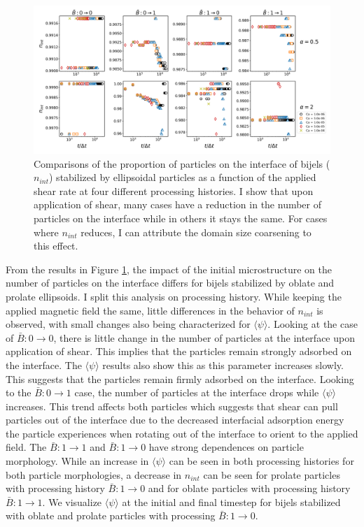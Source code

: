 \begin{figure} 
    \centering 
    \includegraphics[scale=0.3]{../figures/results/paper3/n_int-time_compare.png} 
    \caption{Comparisons of the proportion of particles on the interface of bijels ($n_{int}$) stabilized by ellipsoidal particles as a function of 
             the applied shear rate at four different processing histories. I show that upon application of shear, many cases have a 
             reduction in the number of particles on the interface while in others it stays the same. For cases where $n_{int}$ reduces, I can 
             attribute the domain size coarsening to this effect.} 
    \label{fig:particles_interface_prop_shear} 
\end{figure}

From the results in Figure \ref{fig:particles_interface_prop_shear}, the impact of the initial microstructure on the number of particles on the interface
differs for bijels stabilized by oblate and prolate ellipsoids. I split this analysis on processing history. While keeping the applied magnetic field
the same, little differences in the behavior of $n_{int}$ is observed, with small changes also being characterized for $\langle \psi \rangle$. 
Looking at the case of $\bar{B}:0 \rightarrow 0$, there is little change in the number of particles at the interface upon application of shear. This implies that the 
particles remain strongly adsorbed on the
interface. The $\langle \psi \rangle$ results also show this as this parameter increases slowly. This suggests that the particles remain firmly adsorbed
on the interface. Looking to the $\bar{B}:0 \rightarrow 1$ case, the number of particles at the interface drops while $\langle \psi \rangle$ increases. This
trend affects both particles which suggests that shear can pull particles out of the interface due to the decreased
interfacial adsorption energy the particle experiences when rotating out of the interface to orient to the applied field. The $\bar{B}:1 \rightarrow 1$ and 
$\bar{B}:1 \rightarrow 0$ have strong dependences on particle morphology. While an increase in $\langle \psi \rangle$ can be seen in both processing histories 
for both particle morphologies, a decrease in $n_{int}$ can be seen for prolate particles with processing history $\bar{B}:1 \rightarrow 0$ and for 
oblate particles with processing history $\bar{B}:1 \rightarrow 1$. We visualize $\langle \psi \rangle$ at the initial and final timestep for bijels stabilized with
oblate and prolate particles with processing $\bar{B}:1 \rightarrow 0$.


